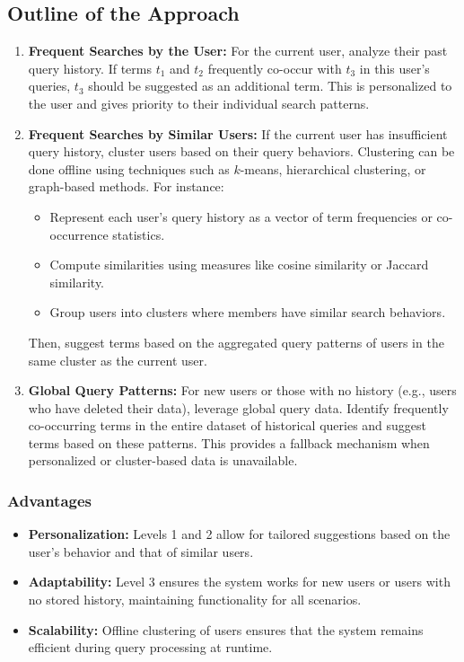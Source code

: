 \subsection*{Outline of the Approach}

\begin{enumerate}
    \item \textbf{Frequent Searches by the User:} 
    For the current user, analyze their past query history. If terms \( t_1 \) and \( t_2 \) frequently co-occur with \( t_3 \) in this user's queries, \( t_3 \) should be suggested as an additional term. This is personalized to the user and gives priority to their individual search patterns.
    \item \textbf{Frequent Searches by Similar Users:} 
    If the current user has insufficient query history, cluster users based on their query behaviors. Clustering can be done offline using techniques such as $k$-means, hierarchical clustering, or graph-based methods. For instance:
    \begin{itemize}
        \item Represent each user's query history as a vector of term frequencies or co-occurrence statistics.
        \item Compute similarities using measures like cosine similarity or Jaccard similarity.
        \item Group users into clusters where members have similar search behaviors.
    \end{itemize}
    Then, suggest terms based on the aggregated query patterns of users in the same cluster as the current user.

    \item \textbf{Global Query Patterns:} 
    For new users or those with no history (e.g., users who have deleted their data), leverage global query data. Identify frequently co-occurring terms in the entire dataset of historical queries and suggest terms based on these patterns. This provides a fallback mechanism when personalized or cluster-based data is unavailable.
\end{enumerate}



\subsubsection*{Advantages}
\begin{itemize}
    \item \textbf{Personalization:} Levels 1 and 2 allow for tailored suggestions based on the user's behavior and that of similar users.
    \item \textbf{Adaptability:} Level 3 ensures the system works for new users or users with no stored history, maintaining functionality for all scenarios.
    \item \textbf{Scalability:} Offline clustering of users ensures that the system remains efficient during query processing at runtime.
\end{itemize}

